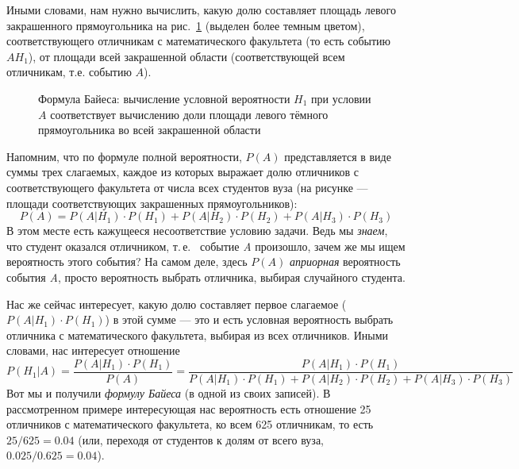 \documentclass[11pt]{article}
\begin{document}
Иными словами, нам нужно вычислить, какую долю составляет площадь левого закрашенного прямоугольника на рис.~\ref{fig:bayes} (выделен более темным цветом), соответствующего отличникам с математического факультета (то есть событию $AH_1$), от площади всей закрашенной области (соответствующей всем отличникам, т.е.  событию $A$).

\begin{figure}[htb]
	\begin{center}
		\caption{Формула Байеса: вычисление условной вероятности $H_1$ при условии $A$ соответствует вычислению доли площади левого тёмного прямоугольника во всей закрашенной области}\label{fig:bayes}
	\end{center}
\end{figure}

Напомним, что по формуле полной вероятности, $P(A)$ представляется в виде суммы трех слагаемых, каждое из которых выражает долю отличников с соответствующего факультета от числа всех студентов вуза (на рисунке — площади соответствующих закрашенных прямоугольников):
\begin{equation*}
	P(A)=P(A|H_1)\cdot P(H_1)+P(A|H_2)\cdot P(H_2)+P(A|H_3)\cdot P(H_3)
\end{equation*}
В этом месте есть кажущееся несоответствие условию задачи. Ведь мы \textit{знаем}, что студент оказался отличником, т.\,е.~ событие \textit{A} произошло, зачем же мы ищем вероятность этого события? На самом деле, здесь $P(A)$ \textit{априорная} вероятность события \textit{A}, просто вероятность выбрать отличника, выбирая случайного студента.

Нас же сейчас интересует, какую долю составляет первое слагаемое ($P(A|H_1)\cdot P(H_1)$) в этой сумме — это и есть условная вероятность выбрать отличника с математического факультета, выбирая из всех отличников. Иными словами, нас интересует отношение
\begin{equation*}
	P(H_1|A)=\frac{P(A|H_1)\cdot P(H_1)}{P(A)} = \frac{P(A|H_1)\cdot P(H_1)}{P(A|H_1)\cdot
	P(H_1)+P(A|H_2)\cdot P(H_2)+P(A|H_3)\cdot P(H_3)}
\end{equation*}
Вот мы и получили \emph{формулу Байеса} (в одной из своих записей). В рассмотренном примере интересующая нас вероятность есть отношение 25 отличников с математического факультета, ко всем 625 отличникам, то есть $25/625=0.04$ (или, переходя от студентов к долям от всего вуза, $0.025/0.625=0.04$).
\end{document}

